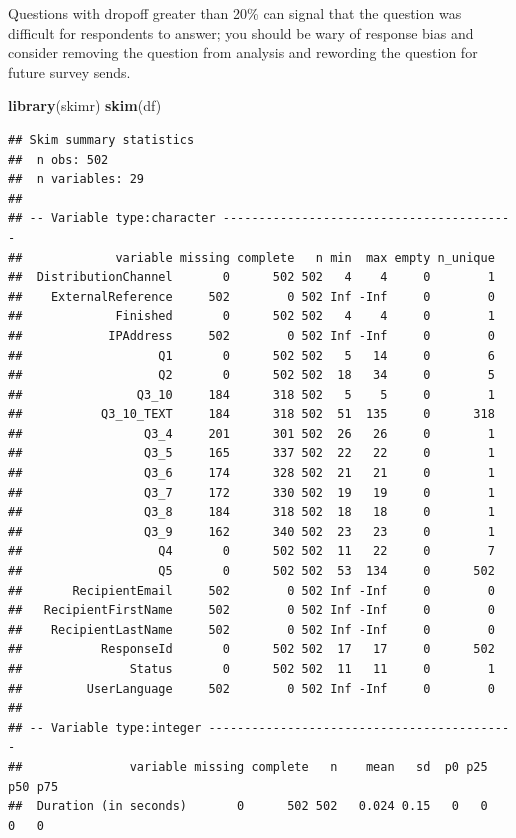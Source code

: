 \documentclass[]{book}
\newenvironment{Shaded}{\begin{snugshade}}{\end{snugshade}}
\newcommand{\KeywordTok}[1]{\textcolor[rgb]{0.13,0.29,0.53}{\textbf{#1}}}
\newcommand{\NormalTok}[1]{#1}
\begin{document}
Questions with dropoff greater than 20\% can signal that the question
was difficult for respondents to answer; you should be wary of response
bias and consider removing the question from analysis and rewording the
question for future survey sends.

\begin{Shaded}
\begin{Highlighting}[]
\KeywordTok{library}\NormalTok{(skimr)}
\KeywordTok{skim}\NormalTok{(df)}
\end{Highlighting}
\end{Shaded}

\begin{verbatim}
## Skim summary statistics
##  n obs: 502 
##  n variables: 29 
## 
## -- Variable type:character -----------------------------------------
##             variable missing complete   n min  max empty n_unique
##  DistributionChannel       0      502 502   4    4     0        1
##    ExternalReference     502        0 502 Inf -Inf     0        0
##             Finished       0      502 502   4    4     0        1
##            IPAddress     502        0 502 Inf -Inf     0        0
##                   Q1       0      502 502   5   14     0        6
##                   Q2       0      502 502  18   34     0        5
##                Q3_10     184      318 502   5    5     0        1
##           Q3_10_TEXT     184      318 502  51  135     0      318
##                 Q3_4     201      301 502  26   26     0        1
##                 Q3_5     165      337 502  22   22     0        1
##                 Q3_6     174      328 502  21   21     0        1
##                 Q3_7     172      330 502  19   19     0        1
##                 Q3_8     184      318 502  18   18     0        1
##                 Q3_9     162      340 502  23   23     0        1
##                   Q4       0      502 502  11   22     0        7
##                   Q5       0      502 502  53  134     0      502
##       RecipientEmail     502        0 502 Inf -Inf     0        0
##   RecipientFirstName     502        0 502 Inf -Inf     0        0
##    RecipientLastName     502        0 502 Inf -Inf     0        0
##           ResponseId       0      502 502  17   17     0      502
##               Status       0      502 502  11   11     0        1
##         UserLanguage     502        0 502 Inf -Inf     0        0
## 
## -- Variable type:integer -------------------------------------------
##               variable missing complete   n    mean   sd  p0 p25 p50 p75
##  Duration (in seconds)       0      502 502   0.024 0.15   0   0   0   0

\end{verbatim}
\end{document}
